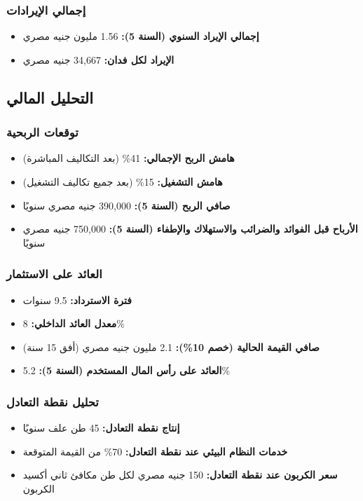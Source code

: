 \subsubsection{إجمالي الإيرادات}
\begin{itemize}
    \item \textbf{إجمالي الإيراد السنوي (السنة 5):} 1.56 مليون جنيه مصري
    \item \textbf{الإيراد لكل فدان:} 34,667 جنيه مصري
\end{itemize}

\subsection{التحليل المالي}

\subsubsection{توقعات الربحية}
\begin{itemize}
    \item \textbf{هامش الربح الإجمالي:} 41\% (بعد التكاليف المباشرة)
    \item \textbf{هامش التشغيل:} 15\% (بعد جميع تكاليف التشغيل)
    \item \textbf{صافي الربح (السنة 5):} 390,000 جنيه مصري سنويًا
    \item \textbf{الأرباح قبل الفوائد والضرائب والاستهلاك والإطفاء (السنة 5):} 750,000 جنيه مصري سنويًا
\end{itemize}

\subsubsection{العائد على الاستثمار}
\begin{itemize}
    \item \textbf{فترة الاسترداد:} 9.5 سنوات
    \item \textbf{معدل العائد الداخلي:} 8\%
    \item \textbf{صافي القيمة الحالية (خصم 10\%):} 2.1 مليون جنيه مصري (أفق 15 سنة)
    \item \textbf{العائد على رأس المال المستخدم (السنة 5):} 5.2\%
\end{itemize}

\subsubsection{تحليل نقطة التعادل}
\begin{itemize}
    \item \textbf{إنتاج نقطة التعادل:} 45 طن علف سنويًا
    \item \textbf{خدمات النظام البيئي عند نقطة التعادل:} 70\% من القيمة المتوقعة
    \item \textbf{سعر الكربون عند نقطة التعادل:} 150 جنيه مصري لكل طن مكافئ ثاني أكسيد الكربون
\end{itemize}

